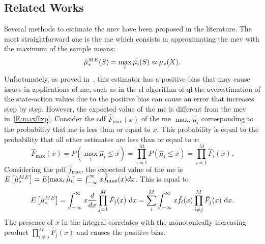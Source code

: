\subsection{Related Works}\label{S:mev_works}
Several methods to estimate the \gls{mev} have been proposed in the literature. The most straightforward one is the \gls{me} which consists in approximating the \gls{mev} with the maximum of the sample means:
\begin{equation}\label{E:biasME}
\hat\mu_*^{ME}(S) = \max_{i}\hat{\mu}_{i}(S) \approx \mu_{*}(X).
\end{equation}
Unfortunately, as proved in~\cite{smith2006optimizer}, this estimator has a positive bias that may cause issues in applications of \gls{me}, such as in the \gls{rl} algorithm of \gls{ql} the overestimation of the state-action values due to the positive bias can cause an error that increases step by step. However, the expected value of the \gls{me} is different from the \gls{mev} in~\ref{E:maxExp}. Consider the \gls{cdf} $\hat{F}_{\max}(x)$ of the \gls{me} $\max_{i}\hat\mu_{i}$ corresponding to the probability that \gls{me} is less than or equal to $x$. This probability is equal to the probability that all other estimates are less than or equal to $x$: 
$$\hat F_{\max}(x) = P(\max_{i}\hat\mu_{i} \leq x) = \prod^M_{i=1} P(\hat\mu_{i} \leq x) = \prod^M_{i=1} \hat F_i(x).$$
Considering the \gls{pdf} $\hat f_{\max}$, the expected value of the \gls{me} is $E\left[\hat\mu_*^{ME}\right] = E [ \max_{i}\hat\mu_{i} ] = \int^{\infty}_{-\infty} x \hat f_{\max}(x) dx$. This is equal to
\begin{equation*}
E\left[\hat\mu_*^{ME}\right] = \int^{\infty}_{-\infty} x \frac{d}{dx} \prod^M_{j=1} \hat F_j(x)~\mathrm{d}x =\sum^M_i \int^{\infty}_{-\infty} x \hat f_i(x) \prod^M_{i \neq j} \hat F_j(x)~\mathrm{d}x.
\end{equation*}
The presence of $x$ in the integral correlates with the monotonically increasing product $\prod^M_{i \neq j} \hat F_j(x)$ and causes the positive bias.

